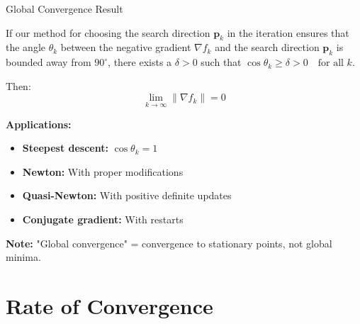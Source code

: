 \documentclass[aspectratio=1610]{beamer}
\begin{document}
\begin{frame}{Global Convergence Result}
  \begin{corollary}
    If our method for choosing the search direction $\mathbf{p}_k$ in the iteration ensures that the angle $\theta_k$ between the negative gradient $\nabla f_k$ and the search direction $\mathbf{p}_k$ is bounded away from $90^\circ$, there exists a $\delta > 0$ such that $\cos \theta_k \geq \delta > 0 \quad \text{for all } k$.
    
    Then: $$\lim_{k \to \infty} \|\nabla f_k\| = 0$$
  \end{corollary}
  
  \vspace{0.3cm}
  
  \textbf{Applications:}
  \begin{itemize}
    \item \textbf{Steepest descent:} $\cos \theta_k = 1$
    \item \textbf{Newton:} With proper modifications 
    \item \textbf{Quasi-Newton:} With positive definite updates 
    \item \textbf{Conjugate gradient:} With restarts 
  \end{itemize}
  
  \vspace{0.3cm}
  
  \textbf{Note:} "Global convergence" = convergence to stationary points, not global minima.
\end{frame}

\section{Rate of Convergence}
\end{document}
